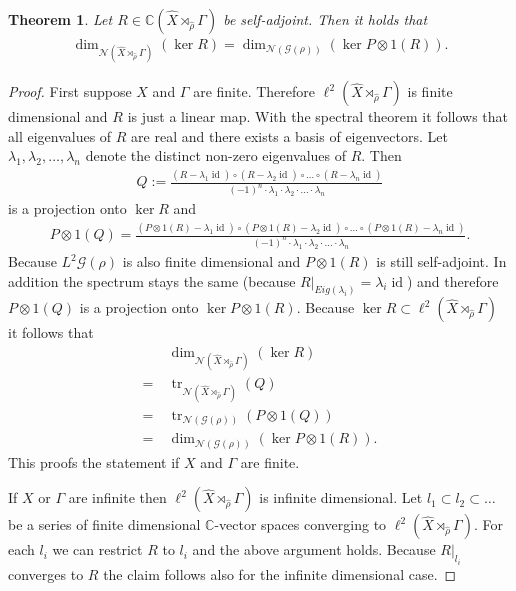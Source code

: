 \documentclass[12pt,a4paper]{scrartcl}
\theoremstyle{plain}
\newtheorem{Theorem}{Theorem}[subsection]
\theoremstyle{definition}
\newcommand{\C}{\mathbb{C}} %
\newcommand{\2}{\mathbb{Z} / 2 \mathbb{Z}}
\newcommand{\G}{\mathcal{G}}
\newcommand{\1}{\bar{1}}
\newcommand{\0}{\bar{0}}
\newcommand{\tr}{\operatorname{tr}}
\newcommand{\id}{\operatorname{id}}
\begin{document}
\begin{Theorem} \label{pontr_vNd}
	Let $R \in \C(\hat{X} \rtimes_{\hat{\rho}} \Gamma)$ be self-adjoint. Then it holds that
	\begin{align*}
		\dim_{\mathcal{N}(\hat{X} \rtimes_{\hat{\rho}} \Gamma)}(\ker R) = \dim_{\mathcal{N}(\G(\rho))}(\ker P \otimes 1(R)).
	\end{align*}
\end{Theorem} 
\begin{proof}
	First suppose $X$ and $\Gamma$ are finite. Therefore $\ell^2(\hat{X} \rtimes_{\hat{\rho}} \Gamma)$ is finite dimensional and $R$ is just a linear map. With the spectral theorem it follows that all eigenvalues of $R$ are real and there exists a basis of eigenvectors. Let $\lambda_1, \lambda_2, \ldots, \lambda_n$ denote the distinct non-zero eigenvalues of $R$. Then
	\begin{align*}
		Q := \frac{(R - \lambda_1 \id) \circ (R - \lambda_2 \id) \circ \ldots \circ (R - \lambda_n \id)}{(-1)^n \cdot \lambda_1 \cdot \lambda_2 \cdot \ldots \cdot \lambda_n}
	\end{align*}
	is a projection onto $\ker R$ and 
	\begin{align*}
		P \otimes 1 (Q) = \frac{(P \otimes 1(R) - \lambda_1 \id) \circ (P \otimes 1(R) - \lambda_2 \id) \circ \ldots \circ (P \otimes 1(R) - \lambda_n \id)}{(-1)^n \cdot \lambda_1 \cdot \lambda_2 \cdot \ldots \cdot \lambda_n}.
	\end{align*}
	Because $L^2 \G (\rho)$ is also finite dimensional and $P \otimes 1(R)$ is still self-adjoint. In addition the spectrum stays the same (because $R|_{Eig(\lambda_i)} = \lambda_i \id$) and therefore $P \otimes 1 (Q)$ is a projection onto $\ker P \otimes 1 (R)$. Because $\ker R \subset \ell^2(\hat{X} \rtimes_{\hat{\rho}} \Gamma) $ it follows that
	\begin{align*}
		 &~ \dim_{\mathcal{N}(\hat{X} \rtimes_{\hat{\rho}} \Gamma)}(\ker R) \\
		=&~ \tr_{\mathcal{N}(\hat{X} \rtimes_{\hat{\rho}} \Gamma)}(Q) \\
		=&~ \tr_{\mathcal{N}(\G(\rho))}(P \otimes 1 (Q)) \\
		=&~ \dim_{\mathcal{N}(\G(\rho))}(\ker P \otimes 1 (R)).
	\end{align*}
	This proofs the statement if $X$ and $\Gamma$ are finite.
	
	If $X$ or $\Gamma$ are infinite then $\ell^2(\hat{X} \rtimes_{\hat{\rho}} \Gamma)$ is infinite dimensional. Let $l_1 \subset l_2 \subset \ldots$ be a series of finite dimensional $\C$-vector spaces converging to $\ell^2(\hat{X} \rtimes_{\hat{\rho}} \Gamma)$. For each $l_i$ we can restrict $R$ to $l_i$ and the above argument holds. Because $R|_{l_i}$ converges to $R$ the claim follows also for the infinite dimensional case.
\end{proof}
\end{document}
